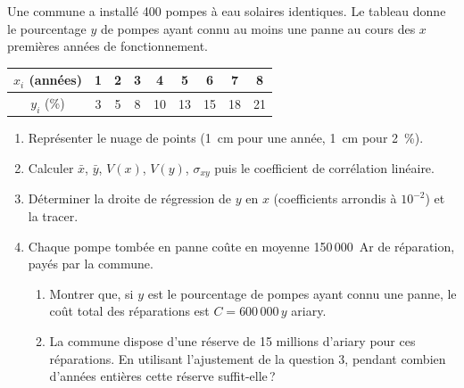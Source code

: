      \begin{exo}
            \label{exo:stat10}
            Une commune a install\'e 400 pompes \`a eau solaires identiques. 
            Le tableau donne le pourcentage $y$ de pompes ayant connu au moins une panne au cours des $x$ premi\`eres ann\'ees
            de fonctionnement.
            \begin{center}
            \begin{tabular}{|c|c|c|c|c|c|c|c|c|}
                  \hline
                  $x_i$ (ann\'ees) & 1 & 2 & 3 & 4 & 5 & 6 & 7 & 8 \\
                  \hline
                  $y_i$ (\%) & 3 & 5 & 8 & 10 & 13 & 15 & 18 & 21 \\
                  \hline
            \end{tabular}
            \end{center}
            \begin{enumerate}
                  \item Repr\'esenter le nuage de points (1~cm pour une ann\'ee, 1~cm pour 2~\%).
                  \item Calculer $\bar{x}$, $\bar{y}$, $V(x)$, $V(y)$, $\sigma_{xy}$ puis le coefficient de corr\'elation lin\'eaire.
                  \item D\'eterminer la droite de r\'egression de $y$ en $x$ (coefficients arrondis \`a $10^{-2}$) et la tracer.
                  \item Chaque pompe tomb\'ee en panne co\^ute en moyenne 150\,000~Ar de r\'eparation, pay\'es par la commune.
                        \begin{enumerate}
                        \item Montrer que, si $y$ est le pourcentage de pompes ayant connu une panne, le co\^ut total des
                              r\'eparations est $C = 600\,000\, y$ ariary.
                        \item La commune dispose d'une r\'eserve de 15 millions d'ariary pour ces r\'eparations.
                              En utilisant l'ajustement de la question 3, pendant combien d'ann\'ees enti\`eres cette r\'eserve
                              suffit-elle\,?
                        \end{enumerate}
            \end{enumerate}
      \end{exo}
